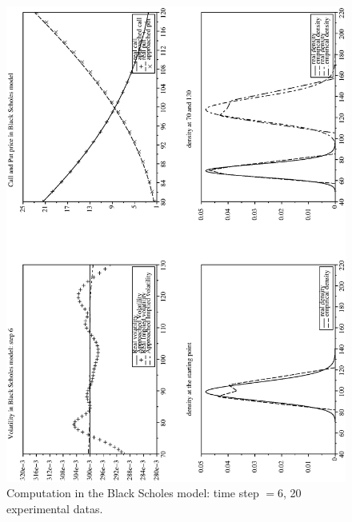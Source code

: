 \documentclass[a4paper]{article}
\begin{document}
\begin{figure}[tbp]
\begin{center}
\includegraphics[width=12.5cm]{ArticlePS/20BS6.eps}
\caption{Computation in the Black Scholes model: time step $=6$,
20 experimental datas.\label{BS6}}
\end{center}
\end{figure}
\end{document}
